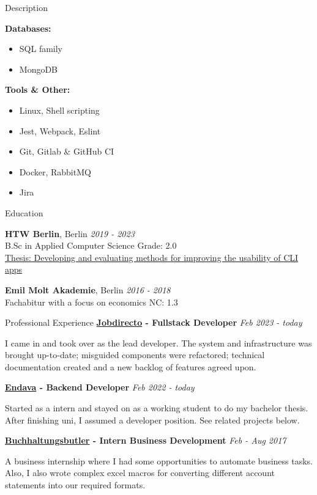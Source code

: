 \documentclass{cv}
\begin{document}
\begin{rSection}{Description}
\begin{minipage}[t]{\skillWidth\linewidth}
    \textbf{Databases:}
    \begin{itemize}
      \item SQL family
      \item MongoDB
    \end{itemize}

    \textbf{Tools \& Other:}
    \begin{itemize}
      \item Linux, Shell scripting
      \item Jest, Webpack, Eslint
      \item Git, Gitlab \& GitHub CI
      \item Docker, RabbitMQ
      \item Jira
    \end{itemize}

  \end{minipage}
\end{rSection}

\begin{rSection}{Education}

{\bf HTW Berlin}, Berlin \hfill {\em 2019 - 2023}\\
B.Sc in Applied Computer Science
  \hfill Grade: 2.0\\
  \href{https://github.com/jneidel/ba}{Thesis: Developing and evaluating methods for improving the usability of CLI apps}

\smallskip

{\bf Emil Molt Akademie}, Berlin \hfill {\em 2016 - 2018}\\
Fachabitur with a focus on economics
\hfill NC: 1.3

\end{rSection}

\begin{rSection}{Professional Experience}
  \textbf{\href{https://www.jobdirecto.com/}{Jobdirecto} - Fullstack Developer}
  \hfill {\em Feb 2023 - today}

  I came in and took over as the lead developer.
  The system and infrastructure was brought up-to-date; misguided components
  were refactored; technical documentation created and a new backlog of features agreed upon.

  \textbf{\href{https://www.endava.de/}{Endava} - Backend Developer}
  \hfill {\em Feb 2022 - today}

  Started as a intern and stayed on as a working student to do my bachelor thesis.
  After finishing uni, I assumed a developer position.
  See related projects below.

  \textbf{\href{https://buchhaltungsbutler.de/}{Buchhaltungsbutler} - Intern Business Development}
  \hfill {\em Feb - Aug 2017}

  A business internship where I had some opportunities to automate business tasks.
  Also, I also wrote complex excel macros for converting different account statements into our required formats.
\end{rSection}
\end{document}
